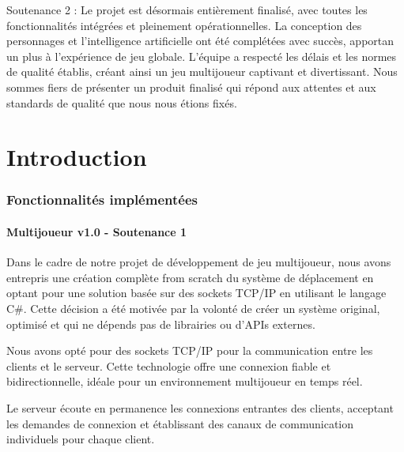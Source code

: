 \documentclass[
	article,			%
	11pt,				%
	oneside,			%
	a4paper,			%
	chapter=TITLE,
	french,			%
	sumario=tradicional
	]{base_nt}
\begin{document}
Soutenance 2 : Le projet est désormais entièrement finalisé, avec toutes les fonctionnalités intégrées et pleinement opérationnelles. La conception des personnages et l'intelligence artificielle ont été complétées avec succès, apportan un plus à l'expérience de jeu globale. L'équipe a respecté les délais et les normes de qualité établis, créant ainsi un jeu multijoueur captivant et divertissant. Nous sommes fiers de présenter un produit finalisé qui répond aux attentes et aux standards de qualité que nous nous étions fixés.

\textual

\newpage

\customtableofcontents

\newpage

\part{Introduction}
\section{Fonctionnalités implémentées}

\subsection{Multijoueur v1.0 - Soutenance 1}

Dans le cadre de notre projet de développement de jeu multijoueur, nous avons entrepris une création complète from scratch du système de déplacement en optant pour une solution basée sur des sockets TCP/IP en utilisant le langage C\#. Cette décision a été motivée par la volonté de créer un système original, optimisé et qui ne dépends pas de librairies ou d'APIs externes.

Nous avons opté pour des sockets TCP/IP pour la communication entre les clients et le serveur. Cette technologie offre une connexion fiable et bidirectionnelle, idéale pour un environnement multijoueur en temps réel.

Le serveur écoute en permanence les connexions entrantes des clients, acceptant les demandes de connexion et établissant des canaux de communication individuels pour chaque client.
\end{document}

